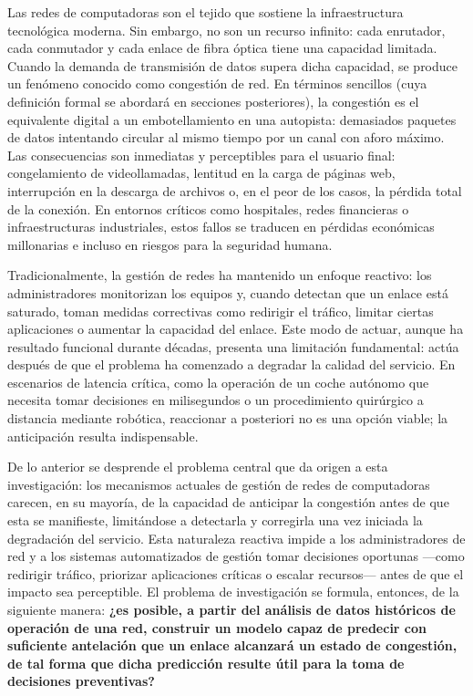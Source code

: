 \documentclass[12pt]{report}
\begin{document}
Las redes de computadoras son el tejido que sostiene la infraestructura tecnológica moderna. Sin embargo, no son un recurso infinito: cada enrutador, cada conmutador y cada enlace de fibra óptica tiene una capacidad limitada. Cuando la demanda de transmisión de datos supera dicha capacidad, 
se produce un fenómeno conocido como congestión de red. En términos sencillos (cuya definición formal se abordará en secciones posteriores), la congestión es el equivalente digital a un embotellamiento en una autopista: demasiados paquetes de datos intentando circular al mismo tiempo por un 
canal con aforo máximo. Las consecuencias son inmediatas y perceptibles para el usuario final: congelamiento de videollamadas, lentitud en la carga de páginas web, interrupción en la descarga de archivos o, en el peor de los casos, la pérdida total de la conexión. En entornos críticos como 
hospitales, redes financieras o infraestructuras industriales, estos fallos se traducen en pérdidas económicas millonarias e incluso en riesgos para la seguridad humana.

Tradicionalmente, la gestión de redes ha mantenido un enfoque reactivo: los administradores monitorizan los equipos y, cuando detectan que un enlace está saturado, toman medidas correctivas como redirigir el tráfico, limitar ciertas aplicaciones o aumentar la capacidad del enlace. 
Este modo de actuar, aunque ha resultado funcional durante décadas, presenta una limitación fundamental: actúa después de que el problema ha comenzado a degradar la calidad del servicio. En escenarios de latencia crítica, como la operación de un coche autónomo que necesita tomar decisiones en 
milisegundos o un procedimiento quirúrgico a distancia mediante robótica, reaccionar a posteriori no es una opción viable; la anticipación resulta indispensable.

De lo anterior se desprende el problema central que da origen a esta investigación: los mecanismos actuales de gestión de redes de computadoras carecen, en su mayoría, de la capacidad de anticipar la congestión antes de que esta se manifieste, limitándose a detectarla y corregirla una vez iniciada 
la degradación del servicio. Esta naturaleza reactiva impide a los administradores de red y a los sistemas automatizados de gestión tomar decisiones oportunas —como redirigir tráfico, priorizar aplicaciones críticas o escalar recursos— antes de que el impacto sea perceptible. El problema de 
investigación se formula, entonces, de la siguiente manera: \textbf{¿es posible, a partir del análisis de datos históricos de operación de una red, construir un modelo capaz de predecir con suficiente antelación que un enlace alcanzará un estado de congestión, de tal forma que dicha predicción 
resulte útil para la toma de decisiones preventivas?}
\end{document}
